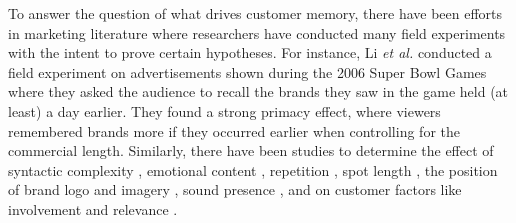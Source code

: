 To answer the question of what drives customer memory, there have been efforts in marketing literature where researchers have conducted many field experiments with the intent to prove certain hypotheses. For instance, Li \textit{et al.} \cite{li2010primacy} conducted a field experiment on advertisements shown during the 2006 Super Bowl Games where they asked the audience to recall the brands they saw in the game held (at least) a day earlier. They found a strong primacy effect, where viewers remembered brands more if they occurred earlier when controlling for the commercial length. Similarly, there have been studies to determine the effect of syntactic complexity \cite{atalay2023creating}, emotional content \cite{putrevu2004consumer,mai2009emotions}, repetition \cite{schmidt2015advertising}, spot length \cite{newstead2010cost,varan2020effects}, the position of brand logo and imagery \cite{newstead2010cost}, sound presence \cite{bellman2021can}, and on customer factors like involvement and relevance \cite{newstead2010cost,schmidt2015advertising}. 


